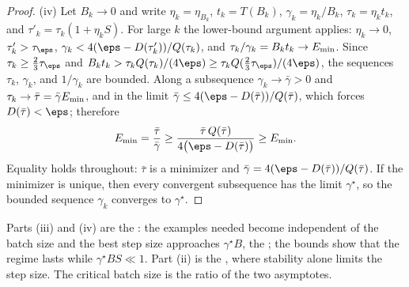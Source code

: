 \begin{refsection}
\begin{proof}
(iv) Let $B_k\to0$ and write $\eta_k=\eta_{B_k}$, $t_k=T(B_k)$, $\gamma_k=\eta_k/B_k$, $\tau_k=\eta_kt_k$, and $\tau'_k=\tau_k(1+\eta_kS)$. For large $k$ the lower-bound argument applies: $\eta_k\to0$, $\tau'_k>\tau_\eps$, $\gamma_k<4(\eps-D(\tau'_k))/Q(\tau_k)$, and $\tau_k/\gamma_k=B_kt_k\to E_{\min}$. Since $\tau_k\ge\frac23\tau_\eps$ and $B_kt_k>\tau_kQ(\tau_k)/(4\eps)\ge\tau_kQ(\frac23\tau_\eps)/(4\eps)$, the sequences $\tau_k$, $\gamma_k$, and $1/\gamma_k$ are bounded. Along a subsequence $\gamma_k\to\bar\gamma>0$ and $\tau_k\to\bar\tau=\bar\gamma E_{\min}$, and in the limit $\bar\gamma\le4(\eps-D(\bar\tau))/Q(\bar\tau)$, which forces $D(\bar\tau)<\eps$; therefore
\[
  \noiseEmin=\frac{\bar\tau}{\bar\gamma}\ge\frac{\bar\tau\,Q(\bar\tau)}{4\bigl(\eps-D(\bar\tau)\bigr)}\ge\noiseEmin .
\]
Equality holds throughout: $\bar\tau$ is a minimizer and $\bar\gamma=4(\eps-D(\bar\tau))/Q(\bar\tau)$. If the minimizer is unique, then every convergent subsequence has the limit $\gamma^\star$, so the bounded sequence $\gamma_k$ converges to $\gamma^\star$.
\end{proof}

Parts (iii) and (iv) are the : the examples needed become independent of the batch size and the best step size approaches $\gamma^\star B$, the ; the bounds show that the regime lasts while $\gamma^\star BS\ll1$. Part (ii) is the , where stability alone limits the step size. The critical batch size is the ratio of the two asymptotes.



\end{refsection}
